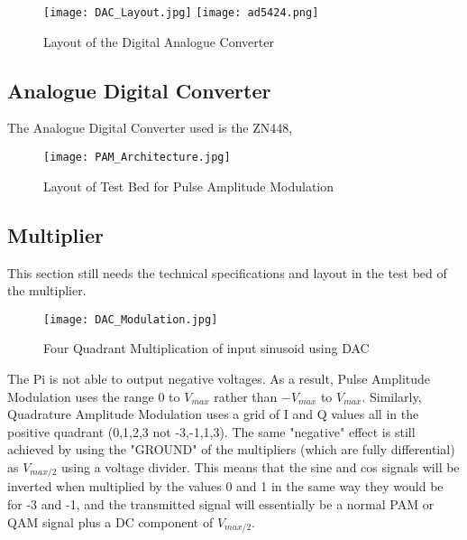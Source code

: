 \documentclass[../main.tex]{subfiles}
\begin{document}
\begin{figure}[ht]
	\centering
	\texttt{[image: DAC\_Layout.jpg]}
	\texttt{[image: ad5424.png]}
	\caption{Layout of the Digital Analogue Converter}
	\label{fig_DAC Layout}
\end{figure}

\subsection{Analogue Digital Converter}

The Analogue Digital Converter used is the ZN448, 

\begin{figure}[ht]
	\centering
	\texttt{[image: PAM\_Architecture.jpg]}
	\caption{Layout of Test Bed for Pulse Amplitude Modulation}
\end{figure}

\subsection{Multiplier} \label{sec_Multiplier}

This section still needs the technical specifications and layout in the test bed of the multiplier.


\begin{figure}[ht]
	\centering
	\texttt{[image: DAC\_Modulation.jpg]}
	\caption{Four Quadrant Multiplication of input sinusoid using DAC}
	\label{fig_}
\end{figure}

The Pi is not able to output negative voltages.
As a result, Pulse Amplitude Modulation uses the range $0$ to $V_{max}$ rather than $-V_{max}$ to $V_{max}$.
Similarly, Quadrature Amplitude Modulation uses a grid of I and Q values all in the positive quadrant (0,1,2,3 not -3,-1,1,3).
The same "negative" effect is still achieved by using the "GROUND" of the multipliers (which are fully differential)
as $V_{max/2}$ using a voltage divider.
This means that the sine and cos signals will be inverted when multiplied by the values 0 and 1 in the same way they would be for -3 and -1, and the transmitted signal will essentially be a normal PAM or QAM signal plus a DC component of $V_{max/2}$.
\end{document}
